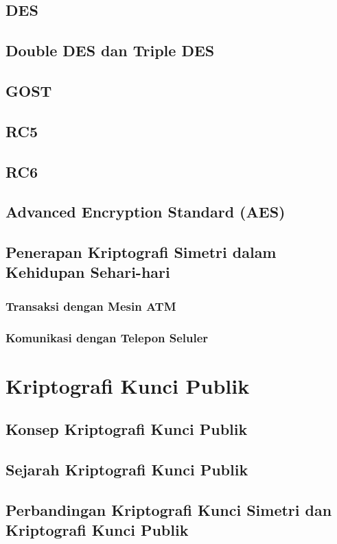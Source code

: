 \documentclass{book}
\begin{document}
     \section{DES}
     \section{Double DES dan Triple DES}
     \section{GOST}
     \section{RC5}
     \section{RC6}
     \section{Advanced Encryption Standard (AES)}
     \section{Penerapan Kriptografi Simetri dalam Kehidupan Sehari-hari}
         \subsection{Transaksi dengan Mesin ATM}
         \subsection{Komunikasi dengan Telepon Seluler}
\chapter{Kriptografi Kunci Publik}         
     \section{Konsep Kriptografi Kunci Publik}
     \section{Sejarah Kriptografi Kunci Publik}
     \section{Perbandingan Kriptografi Kunci Simetri dan Kriptografi Kunci Publik}
\end{document}
